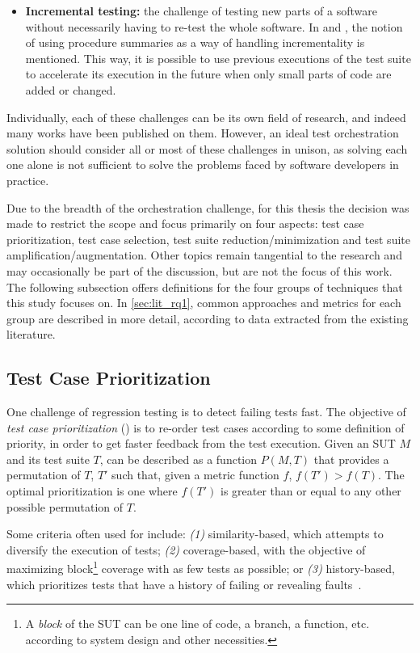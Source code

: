 \begin{itemize}
	\item \textbf{Incremental testing:} the challenge of testing new parts of a software without necessarily having to re-test the whole software. In \cite{harman_start-ups_2018} and \cite{ohearn_continuous_2018}, the notion of using procedure summaries as a way of handling incrementality is mentioned. This way, it is possible to use previous executions of the test suite to accelerate its execution in the future when only small parts of code are added or changed.
\end{itemize}

Individually, each of these challenges can be its own field of research, and indeed many works have been published on them.
However, an ideal test orchestration solution should consider all or most of these challenges in unison, as solving each one alone is not sufficient to solve the problems faced by software developers in practice.

Due to the breadth of the orchestration challenge, for this thesis the decision was made to restrict the scope and focus primarily on four aspects: test case prioritization, test case selection, test suite reduction/minimization and test suite amplification/augmentation.
Other topics remain tangential to the research and may occasionally be part of the discussion, but are not the focus of this work.
The following subsection offers definitions for the four groups of techniques that this study focuses on.
In \autoref{sec:lit_rq1}, common approaches and metrics for each group are described in more detail, according to data extracted from the existing literature.

\subsection{Test Case Prioritization}
\label{sec:tcp}

One challenge of regression testing is to detect failing tests fast.
The objective of \textit{test case prioritization} (\tcp) is to re-order test cases according to some definition of priority, in order to get faster feedback from the test execution.
Given an SUT $M$ and its test suite $T$,
\tcp can be described as a function $P(M, T)$ that provides a permutation of $T$, $T'$ such that, given a metric function $f$, $f(T') > f(T)$.
The optimal prioritization is one where $f(T')$ is greater than or equal to any other possible permutation of $T$. 

Some criteria often used for \tcp include: \textit{(1)} similarity-based, which attempts to diversify the execution of tests; \textit{(2)} coverage-based, with the objective of maximizing block\footnote{A \textit{block} of the SUT can be one line of code, a branch, a function, etc. according to system design and other necessities.} coverage with as few tests as possible; or \textit{(3)} history-based, which prioritizes tests that have a history of failing or revealing faults~\cite{khatibsyarbini_test_2018}.

